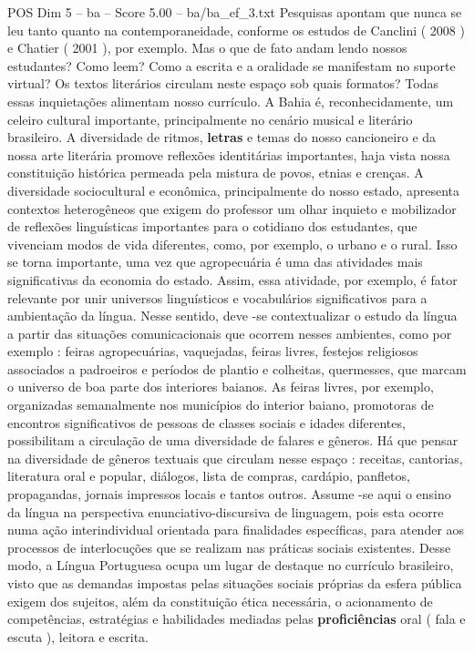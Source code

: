 \begin{textsample}{POS Dim 5 – ba – Score 5.00 – ba/ba\_ef\_3.txt}
Pesquisas apontam que nunca se leu tanto quanto na contemporaneidade, conforme os estudos de Canclini ( 2008 ) e Chatier ( 2001 ), por exemplo.
Mas o que de fato andam lendo nossos estudantes?
Como leem?
Como a escrita e a oralidade se manifestam no suporte virtual?
Os textos literários circulam neste espaço sob quais formatos?
Todas essas inquietações alimentam nosso currículo.
A Bahia é, reconhecidamente, um celeiro cultural importante, principalmente no cenário musical e literário brasileiro.
A diversidade de ritmos, \textbf{letras} e temas do nosso cancioneiro e da nossa arte literária promove reflexões identitárias importantes, haja vista nossa constituição histórica permeada pela mistura de povos, etnias e crenças.
A diversidade sociocultural e econômica, principalmente do nosso estado, apresenta contextos heterogêneos que exigem do professor um olhar inquieto e mobilizador de reflexões linguísticas importantes para o cotidiano dos estudantes, que vivenciam modos de vida diferentes, como, por exemplo, o urbano e o rural.
Isso se torna importante, uma vez que agropecuária é uma das atividades mais significativas da economia do estado.
Assim, essa atividade, por exemplo, é fator relevante por unir universos linguísticos e vocabulários significativos para a ambientação da língua.
Nesse sentido, deve -se contextualizar o estudo da língua a partir das situações comunicacionais que ocorrem nesses ambientes, como por exemplo : feiras agropecuárias, vaquejadas, feiras livres, festejos religiosos associados a padroeiros e períodos de plantio e colheitas, quermesses, que marcam o universo de boa parte dos interiores baianos.
As feiras livres, por exemplo, organizadas semanalmente nos municípios do interior baiano, promotoras de encontros significativos de pessoas de classes sociais e idades diferentes, possibilitam a circulação de uma diversidade de falares e gêneros.
Há que pensar na diversidade de gêneros textuais que circulam nesse espaço : receitas, cantorias, literatura oral e popular, diálogos, lista de compras, cardápio, panfletos, propagandas, jornais impressos locais e tantos outros.
Assume -se aqui o ensino da língua na perspectiva enunciativo-discursiva de linguagem, pois esta ocorre numa ação interindividual orientada para finalidades específicas, para atender aos processos de interlocuções que se realizam nas práticas sociais existentes.
Desse modo, a Língua Portuguesa ocupa um lugar de destaque no currículo brasileiro, visto que as demandas impostas pelas situações sociais próprias da esfera pública exigem dos sujeitos, além da constituição ética necessária, o acionamento de competências, estratégias e habilidades mediadas pelas \textbf{proficiências} oral ( fala e escuta ), leitora e escrita.

\end{textsample}
